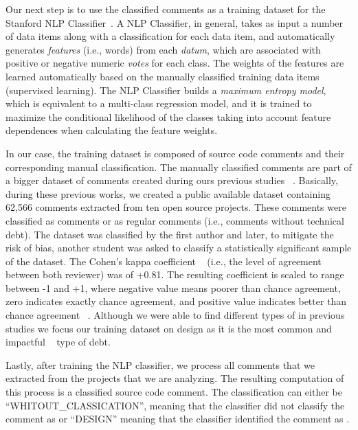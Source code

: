 Our next step is to use the classified \SATD comments as a training dataset for the Stanford NLP Classifier~\cite{Manning2014ACL}.
A NLP Classifier, in general, takes as input a number of data items along with a classification for each data item, and automatically generates \textit{features} (i.e., words) from each \textit{datum}, which are associated with positive or negative numeric \textit{votes} for each class. The weights of the features are learned automatically based on the manually classified training data items (supervised learning). The NLP Classifier builds a \textit{maximum entropy model}, which is equivalent to a multi-class regression model, and it is trained to maximize the conditional likelihood of the classes taking into account feature dependences when calculating the feature weights.

In our case, the training dataset is composed of source code comments and their corresponding manual classification. The manually classified comments are part of a bigger dataset of \SATD comments created during ours previous studies ~\cite{Maldonado2015MTD,Maldonado2015TSE}. Basically, during these previous works, we created a public available dataset containing 62,566 comments extracted from ten open source projects. These comments were classified as \SATD comments or as regular comments (i.e., comments without technical debt). The dataset was classified by the first author and later, to mitigate the risk of bias, another student was asked to classify a statistically significant sample of the dataset. The Cohen's kappa coefficient ~\cite{cohen1960coefficient} (i.e., the level of agreement between both reviewer) was of +0.81. The resulting coefficient is scaled to range between -1 and +1, where negative value means poorer than chance agreement, zero indicates exactly chance agreement, and positive value indicates better than chance agreement ~\cite{fleiss1973equivalence}. Although we were able to find different types of \SATD in previous studies we focus our training dataset on design \SATD as it is the most common and impactful ~\cite{Ernst2015FSE} type of debt. 

Lastly, after training the NLP classifier, we process all comments that we extracted from the projects that we are analyzing. The resulting computation of this process is a classified source code comment. The classification can either be ``WHITOUT\_CLASSICATION'', meaning  that the classifier did not classify the comment as \SATD or ``DESIGN'' meaning that the classifier identified the comment as \SATD.

